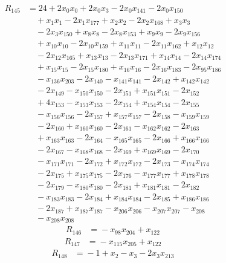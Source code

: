 \begin{align*}
R_{145}&={}24 +2x_{0}x_{0} +2x_{0}x_{3} -2x_{0}x_{141} -2x_{0}x_{150}\\
&\quad{}+x_{1}x_{1} -2x_{1}x_{177} +x_{2}x_{2} -2x_{2}x_{168} +x_{3}x_{3}\\
&\quad{}-2x_{3}x_{150} +x_{8}x_{8} -2x_{8}x_{153} +x_{9}x_{9} -2x_{9}x_{156}\\
&\quad{}+x_{10}x_{10} -2x_{10}x_{159} +x_{11}x_{11} -2x_{11}x_{162} +x_{12}x_{12}\\
&\quad{}-2x_{12}x_{165} +x_{13}x_{13} -2x_{13}x_{171} +x_{14}x_{14} -2x_{14}x_{174}\\
&\quad{}+x_{15}x_{15} -2x_{15}x_{180} +x_{16}x_{16} -2x_{16}x_{183} -2x_{95}x_{186}\\
&\quad{}-x_{136}x_{203} -2x_{140} -x_{141}x_{141} -2x_{142} +x_{142}x_{142}\\
&\quad{}-2x_{149} -x_{150}x_{150} -2x_{151} +x_{151}x_{151} -2x_{152}\\
&\quad{}+4x_{153} -x_{153}x_{153} -2x_{154} +x_{154}x_{154} -2x_{155}\\
&\quad{}-x_{156}x_{156} -2x_{157} +x_{157}x_{157} -2x_{158} -x_{159}x_{159}\\
&\quad{}-2x_{160} +x_{160}x_{160} -2x_{161} -x_{162}x_{162} -2x_{163}\\
&\quad{}+x_{163}x_{163} -2x_{164} -x_{165}x_{165} -2x_{166} +x_{166}x_{166}\\
&\quad{}-2x_{167} -x_{168}x_{168} -2x_{169} +x_{169}x_{169} -2x_{170}\\
&\quad{}-x_{171}x_{171} -2x_{172} +x_{172}x_{172} -2x_{173} -x_{174}x_{174}\\
&\quad{}-2x_{175} +x_{175}x_{175} -2x_{176} -x_{177}x_{177} +x_{178}x_{178}\\
&\quad{}-2x_{179} -x_{180}x_{180} -2x_{181} +x_{181}x_{181} -2x_{182}\\
&\quad{}-x_{183}x_{183} -2x_{184} +x_{184}x_{184} -2x_{185} +x_{186}x_{186}\\
&\quad{}-2x_{187} +x_{187}x_{187} -x_{206}x_{206} -x_{207}x_{207} -x_{208}\\
&\quad{}-x_{208}x_{208}
\end{align*}
\begin{align*}
R_{146}&={}-x_{98}x_{204} +x_{122}
\end{align*}
\begin{align*}
R_{147}&={}-x_{115}x_{205} +x_{122}
\end{align*}
\begin{align*}
R_{148}&={}-1 +x_{2} -x_{3} -2x_{3}x_{213}
\end{align*}
